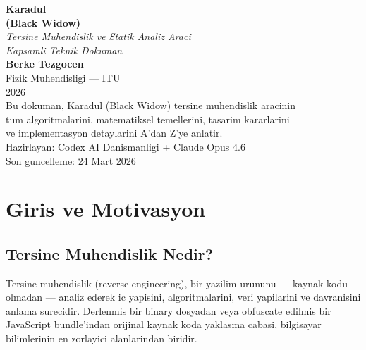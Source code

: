 \documentclass[12pt,a4paper,oneside]{book}
\theoremstyle{definition}
\begin{document}
\begin{titlepage}
\centering
\vspace*{4cm}
{\fontsize{36}{42}\selectfont\bfseries\color{chapterblue}
Karadul\\[8pt]
\Large\color{white!80!blue}(Black Widow)}\\[1.5cm]
{\Large\itshape\color{gray!70!white} Tersine Muhendislik ve Statik Analiz Araci\\[4pt]
Kapsamli Teknik Dokuman}\\[2cm]
{\large\color{white}
\textbf{Berke Tezgocen}\\[8pt]
Fizik Muhendisligi --- ITU\\[4pt]
2026}\\[3cm]
{\small\color{gray!60!white}
Bu dokuman, Karadul (Black Widow) tersine muhendislik aracinin\\
tum algoritmalarini, matematiksel temellerini, tasarim kararlarini\\
ve implementasyon detaylarini A'dan Z'ye anlatir.}\\[4cm]
{\footnotesize\color{gray!40!white}
Hazirlayan: Codex AI Danismanligi + Claude Opus 4.6\\
Son guncelleme: 24 Mart 2026}
\end{titlepage}

\tableofcontents
\newpage

\chapter{Giris ve Motivasyon}
\label{ch:giris}

\section{Tersine Muhendislik Nedir?}
\label{sec:re-nedir}

Tersine muhendislik (reverse engineering), bir yazilim urununu --- kaynak kodu olmadan --- analiz ederek ic yapisini, algoritmalarini, veri yapilarini ve davranisini anlama surecidir. Derlenm\-is bir binary dosyadan veya obfuscate edilmis bir JavaScript bundle'indan orijinal kaynak koda yaklasma cabasi, bilgisayar bilimlerinin en zorlayici alanlarindan biridir.
\end{document}
